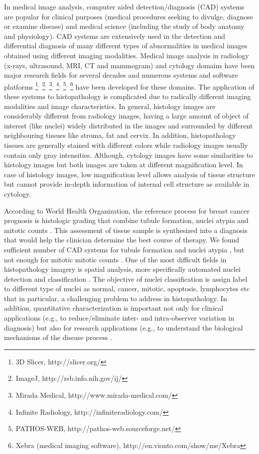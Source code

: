 \documentclass[10pt,twocolumn,letterpaper]{article}
\begin{document}
In medical image analysis, computer aided detection/diagnosis (CAD) systems are popular for clinical purposes (medical procedures seeking to divulge, diagnose or examine disease) and medical science (including the study of body anatomy and physiology). CAD systems are extensively used in the detection and differential diagnosis of many different types of abnormalities in medical images obtained using different imaging modalities. Medical image analysis in radiology (x-rays, ultrasound, MRI, CT and mammogram) and cytology domains have been major research fields for several decades and numerous systems \cite{sonka2000, erickson2002, summers2003, giger2004, bankman2008, he2009, plissiti2013} and software platforms
\footnote{3D Slicer, http://slicer.org/}$^,$
\footnote{ImageJ, http://rsb.info.nih.gov/ij/}$^,$
\footnote{Mirada Medical, http://www.mirada-medical.com/}$^,$
\footnote{Infinite Radiology, http://infiniteradiology.com/}$^,$
\footnote{PATHOS-WEB, http://pathos-web.sourceforge.net/}$^,$
\footnote{Xebra (medical imaging software), http://en.vionto.com/show/me/Xebra}
 have been developed for these domains. The application of these systems to histopathology is complicated due to radically different imaging modalities and image characteristics. In general, histology images are considerably different from radiology images, having a large amount of object of interest (like nuclei) widely distributed in the images and surrounded by different neighbouring tissues like stroma, fat and cervix. In addition, histopathology tissues are generally stained with different colors while radiology images usually contain only gray intensities. Although, cytology images have some similarities to histology images but both images are taken at different magnification level. In case of histology images, low magnification level allows analysis of tissue structure but cannot provide in-depth information of internal cell structure as available in cytology.
 
According to World Health Organization, the reference process for breast cancer prognosis is histologic grading that combine tubule formation, nuclei atypia and mitotic counts \cite{bloom1957}. This assessment of tissue sample is synthesized into a diagnosis that would help the clinician determine the best course of therapy. We found sufficient number of CAD systems for tubule formation \cite{petushi2006, naik2008} and nuclei atypia \cite{cosatto2008, dalle2009, chaudhury2011, dundar2011}, but not enough for mitotic mitotic counts \cite{irshad2013a, irshad2013b}. One of the most difficult fields in histopathology imagery is spatial analysis, more specifically automated nuclei detection and classification \cite{fuchs2011}. The objective of nuclei classification is assign label to different type of nuclei as normal, cancer, mitotic, apoptosis, lymphocytes etc that in particular, a challenging problem to address in histopathology. In addition, quantitative characterization is important not only for clinical applications (e.g., to reduce/eliminate inter- and intra-observer variation in diagnosis) but also for research applications (e.g., to understand the biological mechanisms of the disease process \cite{gurcan2009}.
\end{document}
